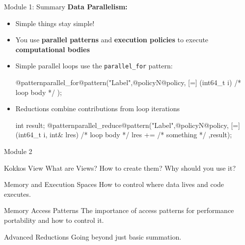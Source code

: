 \begin{frame}[fragile]{Module 1: Summary}
	\textbf{Data Parallelism:}
	\begin{itemize}
		\item Simple things stay simple!
		\item You use \textbf{parallel patterns} and \textbf{execution policies} to execute \textbf{computational bodies}
		\item Simple parallel loops use the \texttt{parallel\_for} pattern:
\begin{code}[linebackgroundcolor={\btLstHL<1->{3}{bodyColor}},frame=single]
  @patternparallel_for@pattern("Label",@policyN@policy, [=] (int64_t i) {
   /* loop body */
  });
\end{code}
\item Reductions combine contributions from loop iterations
\begin{code}[linebackgroundcolor={\btLstHL<1->{3}{bodyColor}},frame=single]
int result;
@patternparallel_reduce@pattern("Label",@policyN@policy, [=] (int64_t i, int& lres) {
   /* loop body */
    lres += /* something */
  },result);
\end{code}
\end{itemize}

\end{frame}

\begin{frame}{Module 2}
  \begin{block}{Kokkos View}
    What are Views? How to create them? Why should you use it?
  \end{block}


  \begin{block}{Memory and Execution Spaces}
    How to control where data lives and code executes.
  \end{block}

  \begin{block}{Memory Access Patterns}
    The importance of access patterns for performance portability and how to control it.
  \end{block}

  \begin{block}{Advanced Reductions}
    Going beyond just basic summation.
  \end{block}
\end{frame}  







